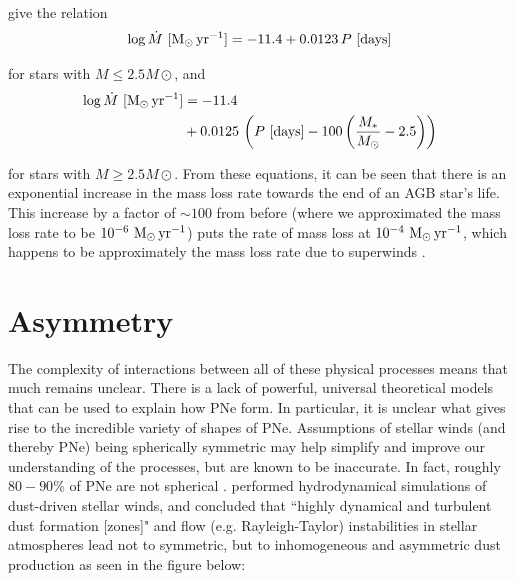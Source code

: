 \documentclass[twocolumn]{aastex63}
\begin{document}
\cite{vassiliadis} give the relation 
\begin{align*}
    \log \dot M~{[\rm M_\odot\,yr^{-1}]} = -11.4 + 0.0123\,P~{[\rm days]}
\end{align*}

for stars with $M\leq 2.5M\odot$, and
\begin{align*}
    \log \dot M~{[\rm M_\odot\,yr^{-1}]} &= -11.4 \\
                                         &+ 0.0125\,\left(P~{[\rm days]} - 100\left(\frac{M_*}{M_\odot} - 2.5\right)\right)
\end{align*}

for stars with $M\geq 2.5M\odot$. From these equations, it can be seen that there is an exponential increase in the mass loss rate towards the end of an AGB star's life. This increase by a factor of $\sim 100$ from before (where we approximated the mass loss rate to be $10^{-6}~{\rm M_\odot\,yr^{-1}}$) puts the rate of mass loss at  $10^{-4}~{\rm M_\odot\,yr^{-1}}$, which happens to be approximately the mass loss rate due to superwinds \citep{iben}. 


\section{Asymmetry}\label{sec:asymmetry}

The complexity of interactions between all of these physical processes means that much remains unclear. There is a lack of powerful, universal theoretical models that can be used to explain how PNe form. In particular, it is unclear what gives rise to the incredible variety of shapes of PNe. Assumptions of stellar winds (and thereby PNe) being spherically symmetric may help simplify and improve our understanding of the processes, but are known to be inaccurate. In fact, roughly $80-90\%$ of PNe are not spherical \citep{demarco, soker1997}. \cite{woitke} performed hydrodynamical simulations of dust-driven stellar winds, and concluded that ``highly dynamical and turbulent dust formation [zones]" and flow (e.g. Rayleigh-Taylor) instabilities in stellar atmospheres lead not to symmetric, but to inhomogeneous and asymmetric dust production as seen in the figure below:
\end{document}

